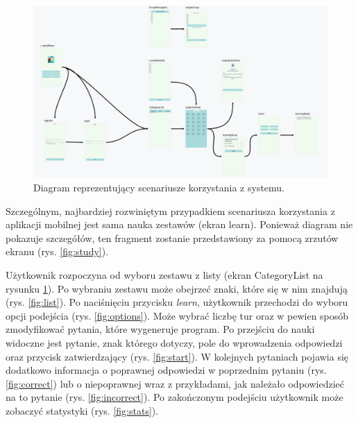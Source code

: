 \documentclass[a4paper,twoside,12pt]{book}
\begin{document}
\begin{figure}[]
\centering
\includegraphics[width=\textwidth]{Navgraph}
\caption{Diagram reprezentujący scenariusze korzystania z systemu.}
\label{fig:navgraph}
\end{figure}

Szczególnym, najbardziej rozwiniętym przypadkiem scenariusza korzystania z aplikacji mobilnej jest sama nauka zestawów (ekran learn). Ponieważ diagram nie pokazuje szczegółów, ten fragment zostanie przedstawiony za pomocą zrzutów ekranu (rys. \ref{fig:study}). 

Użytkownik rozpoczyna od wyboru zestawu z listy (ekran CategoryList na rysunku \ref{fig:navgraph}). Po wybraniu zestawu może obejrzeć znaki, które się w nim znajdują (rys. \ref{fig:list}). Po naciśnięciu przycisku \textit{learn}, użytkownik przechodzi do wyboru opcji podejścia (rys. \ref{fig:options}). Może wybrać liczbę tur oraz w pewien sposób zmodyfikować pytania, które wygeneruje program.  Po przejściu do nauki widoczne jest pytanie, znak którego dotyczy, pole do wprowadzenia odpowiedzi oraz przycisk zatwierdzający (rys. \ref{fig:start}). W kolejnych pytaniach pojawia się dodatkowo informacja o poprawnej odpowiedzi w poprzednim pytaniu (rys. \ref{fig:correct}) lub o niepoprawnej wraz z przykładami, jak należało odpowiedzieć na to pytanie (rys. \ref{fig:incorrect}). Po zakończonym podejściu użytkownik może zobaczyć statystyki (rys. \ref{fig:stats}).


\end{document}
